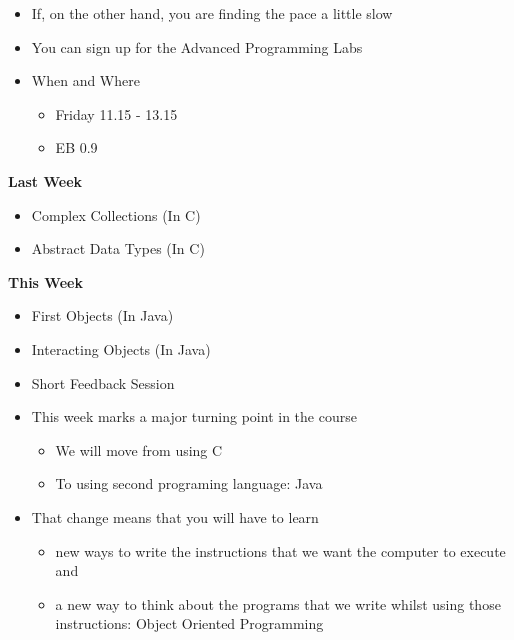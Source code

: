 \documentclass{beamer}
\begin{document}
\begin{frame} 
\begin{itemize}
\item If, on the other hand, you are finding the pace a little slow  
\item You can sign up for the Advanced Programming Labs
\bigskip
\item When and Where
\begin{itemize}
\item Friday 11.15 - 13.15 
\item EB 0.9
\end{itemize}
\end{itemize}
\end{frame}

\begin{frame}
\begin{center}
\textbf{Last Week}
\end{center}
\begin{itemize}
\item Complex Collections (In C)
\item Abstract Data Types (In C)
\end{itemize}
\end{frame}

\begin{frame}
\begin{center}
\textbf{This Week}
\end{center}
\begin{itemize}
\item First Objects (In Java)
\item Interacting Objects (In Java)
\item Short Feedback Session
\end{itemize}
\end{frame}

\begin{frame}{}
\begin{itemize}
\item This week marks a major turning point in the course
\begin{itemize}
\item We will move from using C
\item To using second programing language: Java
\end{itemize}
\end{itemize}\end{frame}\begin{frame}\begin{itemize}

\item That change means that you will have to learn
\begin{itemize}
\item new ways to write the instructions that we want the computer to execute and
\item a new way to think about the programs that we write whilst using
those instructions: Object Oriented Programming
\end{itemize}
\end{itemize}\end{frame}
\end{document}
